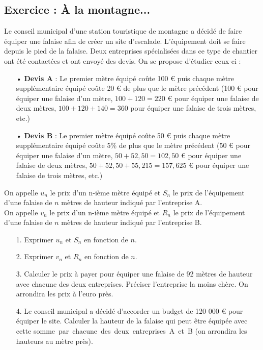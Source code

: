 \newpage

\vspace*{-1cm}

\subsection{Exercice : À la montagne...}

Le conseil municipal d'une station touristique de montagne a décidé de faire équiper une falaise afin de créer un site d'escalade. L'équipement doit se faire depuis le pied de la falaise. Deux entreprises spécialisées dans ce type de chantier ont été contactées et ont envoyé des devis. On se propose d'étudier ceux-ci : \\

\begin{itemize}
\item[•] \textbf{Devis A} : Le premier mètre équipé coûte 100 € puis chaque mètre supplémentaire équipé coûte 20 € de plus que le mètre précédent (100 € pour équiper une falaise d'un mètre, $100 + 120 = 220$ € pour équiper une falaise de deux mètres, $100 + 120 + 140 = 360$ pour équiper une falaise de trois mètres, etc.) \\
\item[•] \textbf{Devis B} : Le premier mètre équipé coûte 50 € puis chaque mètre supplémentaire équipé coûte 5\% de plus que le mètre précédent (50 € pour équiper une falaise d'un mètre, $50 + 52,50 = 102,50$ € pour équiper une falaise de deux mètres, $50 + 52,50 + 55,215 = 157,625$ € pour équiper une falaise de trois mètres, etc.) \\
\end{itemize}

On appelle $u_n$ le prix d'un n-ième mètre équipé et $S_n$ le prix de l'équipement d'une falaise de $n$ mètres de hauteur indiqué par l'entreprise A. \\
On appelle $v_n$ le prix d'un n-ième mètre équipé et $R_n$ le prix de l'équipement d'une falaise de $n$ mètres de hauteur indiqué par l'entreprise B. \\

\begin{itemize}
\item[1.] Exprimer $u_n$ et $S_n$ en fonction de $n$. \\
\item[2.] Exprimer $v_n$ et $R_n$ en fonction de $n$. \\
\item[3.] Calculer le prix à payer pour équiper une falaise de 92 mètres de hauteur avec chacune des deux entreprises. Préciser l'entreprise la moins chère. On arrondira les prix à l'euro près. \\
\item[4.] Le conseil municipal a décidé d'accorder un budget de 120 000 € pour équiper le site. Calculer la hauteur de la falaise qui peut être équipée avec cette \hbox{somme par chacune des deux entreprises A et B} (on arrondira les hauteurs au mètre près). \\
\end{itemize}

